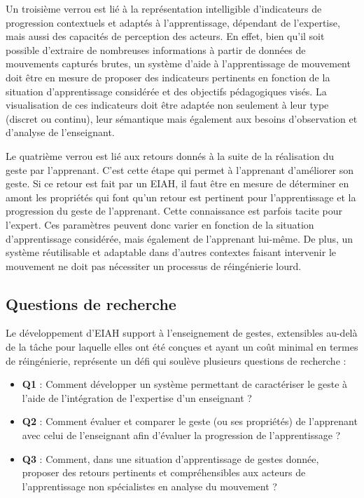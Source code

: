 Un troisième verrou est lié à la représentation intelligible d'indicateurs de progression contextuels et adaptés à l'apprentissage, dépendant de l'expertise, mais aussi des capacités de perception des acteurs. En effet, bien qu'il soit possible d'extraire de nombreuses informations à partir de données de mouvements capturés brutes, un système d'aide à l'apprentissage de mouvement doit être en mesure de proposer des indicateurs pertinents en fonction de la situation d'apprentissage considérée et des objectifs pédagogiques visés. La visualisation de ces indicateurs doit être adaptée non seulement à leur type (discret ou continu), leur sémantique mais également aux besoins d'observation et d'analyse de l'enseignant.

Le quatrième verrou est lié aux retours donnés à la suite de la réalisation du geste par l'apprenant. C'est cette étape qui permet à l'apprenant d'améliorer son geste. Si ce retour est fait par un EIAH, il faut être en mesure de déterminer en amont les propriétés qui font qu'un retour est pertinent pour l'apprentissage et la progression du geste de l'apprenant. Cette connaissance est parfois tacite pour l'expert. Ces paramètres peuvent donc varier en fonction de la situation d'apprentissage considérée, mais également de l'apprenant lui-même. De plus, un système réutilisable et adaptable dans d'autres contextes faisant intervenir le mouvement ne doit pas nécessiter un processus de réingénierie lourd.

\subsection{Questions de recherche}
Le développement d'EIAH support à l'enseignement de gestes, extensibles au-delà de la tâche pour laquelle elles ont été conçues et ayant un coût minimal en termes de réingénierie, représente un défi qui soulève plusieurs questions de recherche :

\begin{itemize}
\item \textbf{Q1} : Comment développer un système permettant de caractériser le geste à l'aide de l'intégration de l'expertise d'un enseignant ?
\item \textbf{Q2} : Comment évaluer et comparer le geste (ou ses propriétés) de l'apprenant avec celui de l'enseignant afin d'évaluer la progression de l'apprentissage ?
\item \textbf{Q3} : Comment, dans une situation d'apprentissage de gestes donnée, proposer des retours pertinents et compréhensibles aux acteurs de l'apprentissage non spécialistes en analyse du mouvement ?
\end{itemize}

